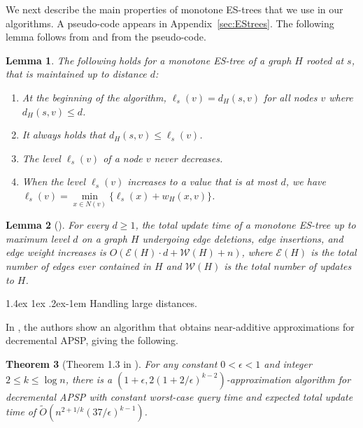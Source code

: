\documentclass[11pt]{article}
\makeatletter
\newtheorem{theorem}{Theorem}[section]
\newtheorem{lemma}[theorem]{Lemma}
\theoremstyle{definition}
\theoremstyle{remark}
\renewcommand{\paragraph}{%
  \@startsection{paragraph}{4}%
  {\z@}{1.4ex \@plus 1ex \@minus .2ex}{-1em}%
  {\normalfont\normalsize\bfseries}%
}
\makeatother
\begin{document}
We next describe the main properties of monotone ES-trees that we use in our algorithms. A pseudo-code appears in Appendix~\ref{sec:EStrees}. The following lemma follows from \cite{HKN2016} and from the pseudo-code.

\begin{lemma}\label{obs:simple_observations_monotone_ES}
The following holds for a monotone ES-tree of a graph $H$ rooted at $s$, that is maintained up to distance $d$:
\begin{enumerate}[label=(\arabic{*})]
\item At the beginning of the algorithm, $\ell_s(v)=d_H(s,v)$ for all nodes $v$ where $d_H(s,v) \leq d$.\label{obs:beginning}
\item It always holds that $d_H(s,v) \leq \ell_s(v)$.\label{item:easy_side}
\item \label{item: observation one} The level $\ell_s(v)$ of a node $v$ never decreases.
\item When the level $\ell_s(v)$ increases to a value that is at most $d$, we have $\ell_s(v) = \min\limits_{x\in N(v)} \{\ell_s(x)+w_{H}(x,v) \}$.\label{item:change}
\end{enumerate}
\end{lemma}


\begin{lemma}[\cite{HKN2016}]\label{lm:ES-tree}
    For every $d \geq 1$, the total update time of a monotone ES-tree up to maximum level $d$ on a graph $H$ undergoing edge deletions, edge insertions, and edge weight increases is $O(\mathcal E(H)\cdot d+\mathcal W(H)+n)$, where $\mathcal E(H)$ is the total number of edges ever contained in $H$ and $\mathcal W(H)$ is the total number of updates to $H$.
\end{lemma}



\paragraph{Handling large distances.} 

In \cite{HKN14}, the authors show an algorithm that obtains near-additive approximations for decremental APSP, giving the following.

\begin{theorem}[Theorem 1.3 in \cite{HKN14}]\label{thm_large}
For any constant $0 < \epsilon < 1$ and integer $2 \leq k \leq \log{n}$, there is a $(1+\epsilon, 2(1+2/\epsilon)^{k-2})$-approximation algorithm for decremental APSP with constant worst-case query time and expected total update time of $\tilde{O}(n^{2+1/k} (37/\epsilon)^{k-1})$.
\end{theorem}
\end{document}
